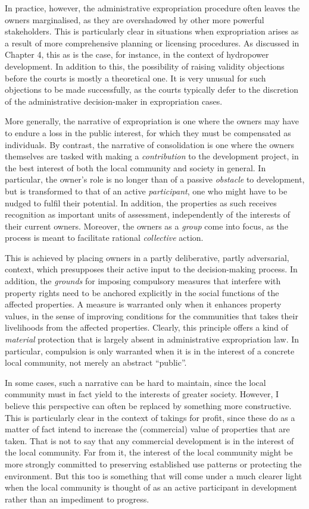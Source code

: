 In practice, however, the administrative expropriation procedure often leaves the owners marginalised, as they are overshadowed by other more powerful stakeholders. This is particularly clear in situations when expropriation arises as a result of more comprehensive planning or licensing procedures. As discussed in Chapter 4, this as is the case, for instance, in the context of hydropower development. In addition to this, the possibility of raising validity objections before the courts is mostly a theoretical one. It is very unusual for such objections to be made successfully, as the courts typically defer to the discretion of the administrative decision-maker in expropriation cases.

More generally, the narrative of expropriation is one where the owners may have to endure a loss in the public interest, for which they must be compensated as individuals. By contrast, the narrative of consolidation is one where the owners themselves are tasked with making a {\it contribution} to the development project, in the best interest of both the local community and society in general. In particular, the owner's role is no longer than of a passive {\it obstacle} to development, but is transformed to that of an active {\it participant}, one who might have to be nudged to fulfil their potential. In addition, the properties as such receives recognition as important units of assessment, independently of the interests of their current owners. Moreover, the owners as a {\it group} come into focus, as the process is meant to facilitate rational {\it collective} action.

This is achieved by placing owners in a partly deliberative, partly adversarial, context, which presupposes their active input to the decision-making process. In addition, the {\it grounds} for imposing compulsory measures that interfere with property rights need to be anchored explicitly in the social functions of the affected properties. A measure is warranted only when it enhances property values, in the sense of improving conditions for the communities that takes their livelihoods from the affected properties. Clearly, this principle offers a kind of {\it material} protection that is largely absent in administrative expropriation law. In particular, compulsion is only warranted when it is in the interest of a concrete local community, not merely an abstract ``public''.

In some cases, such a narrative can be hard to maintain, since the local community must in fact yield to the interests of greater society. However, I believe this perspective can often be replaced by something more constructive. This is particularly clear in the context of takings for profit, since these do as a matter of fact intend to increase the (commercial) value of properties that are taken. That is not to say that any commercial development is in the interest of the local community. Far from it, the interest of the local community might be more strongly committed to preserving established use patterns or protecting the environment. But this too is something that will come under a much clearer light when the local community is thought of as an active participant in development rather than an impediment to progress.

